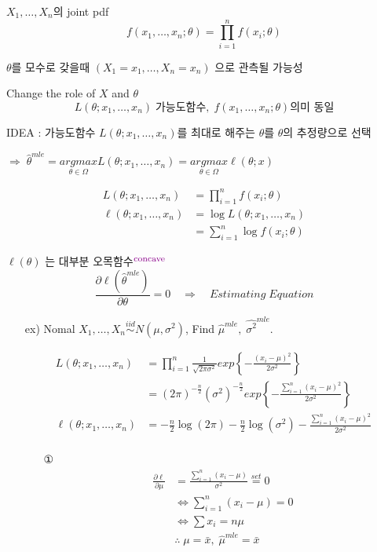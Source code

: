 \documentclass{oblivoir}
\newcommand{\DC}[1]{\textcolor{DarkMagenta}{#1}}%
\newcommand{\UP}[1]{$^{\mbox{\DC{\footnotesize #1}}}$}
\begin{document}
\begin{itemize}
\begin{itemize}
$X_1, \ldots, X_n$의 joint pdf
$$
f(x_1, \ldots, x_n ; \theta) = \prod_{i=1}^n f(x_i ; \theta) 
$$

$\theta$를 모수로 갖을때 $(X_1 = x_1, \ldots, X_n = x_n)$ 으로 관측될 가능성

Change the role of $X$ and $\theta$
$$
L(\theta ; x_1, \ldots, x_n) \; \mbox{가능도함수}, \; f(x_1, \ldots, x_n ; \theta) \mbox{의미 동일}
$$

IDEA : 가능도함수 $L(\theta ; x_1, \ldots, x_n)$를 최대로 해주는 $\theta$를 $\theta$의 추정량으로 선택

$\Rightarrow \; \hat\theta^{mle} = \underset{\theta \in \Omega}{argmax} L(\theta;x_1,\ldots,x_n) = \underset{\theta \in \Omega}{argmax} \ell(\theta;x)$

\begin{align*}
L(\theta ; x_1, \ldots, x_n) &= \prod_{i=1}^n f(x_i ; \theta) \\
\ell(\theta ; x_1, \ldots, x_n) &= \log L(\theta; x_1, \ldots, x_n) \\
&= \sum_{i=1}^n \log f(x_i ; \theta)
\end{align*}

$\ell(\theta)$ 는 대부분 오목함수\UP{concave}
$$
\frac{\partial \ell(\hat\theta^{mle})}{\partial \theta} = 0 \quad \Rightarrow \quad Estimating \; Equation
$$

\begin{itemize}
\item[ex)] 
Nomal $X_1, \ldots, X_n \overset{iid}{\sim} N(\mu, \sigma^2)$, Find $\hat\mu^{mle}, \; \hat{\sigma^2}^{mle}$.

\begin{align*}
L(\theta ; x_1, \ldots, x_n) &= \prod_{i=1}^n \frac{1}{\sqrt{2\pi \sigma^2}} exp\left\{-\frac{(x_i - \mu)^2}{2\sigma^2} \right\} \\
&= (2\pi)^{-\frac{n}{2}} (\sigma^2)^{-\frac{n}{2}} exp\left\{-\frac{\sum_{i=1}^n (x_i - \mu)^2}{2\sigma^2} \right\} \\
\ell(\theta ; x_1, \ldots, x_n) &= -\frac{n}{2} \log (2\pi) - \frac{n}{2} \log (\sigma^2) - \frac{\sum_{i=1}^n (x_i - \mu)^2}{2\sigma^2} \\
\end{align*}
\begin{itemize}
\item[①]
\begin{align*}
\frac{\partial \ell}{\partial \mu} &= \frac{\sum_{i=1}^n (x_i - \mu)}{\sigma^2} \overset{set}{=} 0\\
&\Leftrightarrow \sum_{i=1}^n (x_i - \mu) = 0\\
&\Leftrightarrow \sum x_i = n\mu \\
&\therefore \; \mu = \bar{x}, \; \hat\mu^{mle} = \bar{x}
\end{align*}


\end{itemize}
\end{itemize}
\end{itemize}
\end{itemize}
\end{document}
